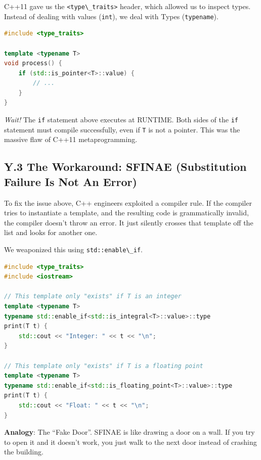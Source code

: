 C++11 gave us the \passthrough{\lstinline!<type\_traits>!} header, which
allowed us to inspect types. Instead of dealing with values
(\passthrough{\lstinline!int!}), we deal with Types
(\passthrough{\lstinline!typename!}).

\begin{lstlisting}[language={C++}]
#include <type_traits>

template <typename T>
void process() {
    if (std::is_pointer<T>::value) {
        // ...
    }
}
\end{lstlisting}

\emph{Wait!} The \passthrough{\lstinline!if!} statement above executes
at RUNTIME. Both sides of the \passthrough{\lstinline!if!} statement
must compile successfully, even if \passthrough{\lstinline!T!} is not a
pointer. This was the massive flaw of C++11 metaprogramming.

\hypertarget{y.3-the-workaround-sfinae-substitution-failure-is-not-an-error}{%
\subsection{Y.3 The Workaround: SFINAE (Substitution Failure Is Not An
Error)}\label{y.3-the-workaround-sfinae-substitution-failure-is-not-an-error}}

To fix the issue above, C++ engineers exploited a compiler rule. If the
compiler tries to instantiate a template, and the resulting code is
grammatically invalid, the compiler doesn't throw an error. It just
silently crosses that template off the list and looks for another one.

We weaponized this using \passthrough{\lstinline!std::enable\_if!}.

\begin{lstlisting}[language={C++}]
#include <type_traits>
#include <iostream>

// This template only "exists" if T is an integer
template <typename T>
typename std::enable_if<std::is_integral<T>::value>::type
print(T t) {
    std::cout << "Integer: " << t << "\n";
}

// This template only "exists" if T is a floating point
template <typename T>
typename std::enable_if<std::is_floating_point<T>::value>::type
print(T t) {
    std::cout << "Float: " << t << "\n";
}
\end{lstlisting}

\textbf{Analogy}: The ``Fake Door''. SFINAE is like drawing a door on a
wall. If you try to open it and it doesn't work, you just walk to the
next door instead of crashing the building.

